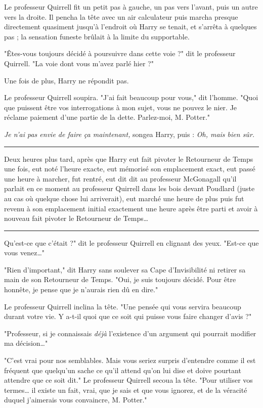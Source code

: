 Le professeur Quirrell fit un petit pas à gauche, un pas vers l'avant, puis un autre vers la droite. Il pencha la tête avec un air calculateur puis marcha presque directement quasiment jusqu'à l'endroit où Harry se tenait, et s'arrêta à quelques pas ; la sensation funeste brûlait à la limite du supportable.

"Êtes-vous toujours décidé à poursuivre dans cette voie ?" dit le professeur Quirrell. "La voie dont vous m'avez parlé hier ?"

Une fois de plus, Harry ne répondit pas.

Le professeur Quirrell soupira. "J'ai fait beaucoup pour vous," dit l'homme. "Quoi que puissent être vos interrogations à mon sujet, vous ne pouvez le nier. Je réclame paiement d'une partie de la dette. Parlez-moi, M. Potter."

\emph{Je n'ai pas envie de faire ça maintenant,}  songea Harry, puis : \emph{Oh, mais bien sûr.} 
\par\noindent\rule{\textwidth}{0.4pt}
Deux heures plus tard, après que Harry eut fait pivoter le Retourneur de Temps une fois, eut noté l'heure exacte, eut mémorisé son emplacement exact, eut passé une heure à marcher, fut rentré, eut dit dit au professeur McGonagall qu'il parlait en ce moment au professeur Quirrell dans les bois devant Poudlard (juste au cas où quelque chose lui arriverait), eut marché une heure de plus puis fut revenu à son emplacement initial exactement une heure après être parti et avoir à nouveau fait pivoter le Retourneur de Temps…
\par\noindent\rule{\textwidth}{0.4pt}
Qu'est-ce que c'était ?" dit le professeur Quirrell en clignant des yeux. "Est-ce que vous venez…"

"Rien d'important," dit Harry sans soulever sa Cape d'Invisibilité ni retirer sa main de son Retourneur de Temps. "Oui, je suis toujours décidé. Pour être honnête, je pense que je n'aurais rien dû en dire."

Le professeur Quirrell inclina la tête. "Une pensée qui vous servira beaucoup durant votre vie. Y a-t-il quoi que ce soit qui puisse vous faire changer d'avis ?"

"Professeur, si je connaissais \emph{déjà}  l'existence d'un argument qui pourrait modifier ma décision…"

"C'est vrai pour nos semblables. Mais vous seriez surpris d'entendre comme il est fréquent que quelqu'un sache ce qu'il attend qu'on lui dise et doive pourtant attendre que ce soit dit." Le professeur Quirrell secoua la tête. "Pour utiliser vos termes… il existe un fait, vrai, que je sais et que vous ignorez, et de la véracité duquel j'aimerais vous convaincre, M. Potter."

